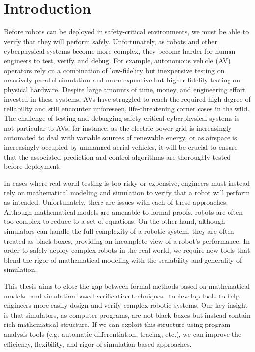 \chapter{Introduction}\label{section:introduction}

Before robots can be deployed in safety-critical environments, we must be able to verify that they will perform safely. Unfortunately, as robots and other cyberphysical systems become more complex, they become harder for human engineers to test, verify, and debug. For example, autonomous vehicle (AV) operators rely on a combination of low-fidelity but inexpensive testing on massively-parallel simulation and more expensive but higher fidelity testing on physical hardware. Despite large amounts of time, money, and engineering effort invested in these systems, AVs have struggled to reach the required high degree of reliability and still encounter unforeseen, life-threatening corner cases in the wild. The challenge of testing and debugging safety-critical cyberphysical systems is not particular to AVs; for instance, as the electric power grid is increasingly automated to deal with variable sources of renewable energy, or as airspace is increasingly occupied by unmanned aerial vehicles, it will be crucial to ensure that the associated prediction and control algorithms are thoroughly tested before deployment.

In cases where real-world testing is too risky or expensive, engineers must instead rely on mathematical modeling and simulation to verify that a robot will perform as intended. Unfortunately, there are issues with each of these approaches. Although mathematical models are amenable to formal proofs, robots are often too complex to reduce to a set of equations. On the other hand, although simulators can handle the full complexity of a robotic system, they are often treated as black-boxes, providing an incomplete view of a robot's performance. In order to safely deploy complex robots in the real world, we require new tools that blend the rigor of mathematical modeling with the scalability and generality of simulation.

This thesis aims to close the gap between formal methods based on mathematical models~\cite{beltaFormalMethodsControl2019,kress-gazitSynthesisRobotsGuarantees2018} and simulation-based verification techniques~\cite{zhouRoCUSRobotController2021,corsoSurveyAlgorithmsBlackBox2021,okellyScalableEndtoEndAutonomous2018} to develop tools to help engineers more easily design and verify complex robotic systems. Our key insight is that simulators, as computer programs, are not black boxes but instead contain rich mathematical structure. If we can exploit this structure using program analysis tools (e.g. automatic differentiation, tracing, etc.), we can improve the efficiency, flexibility, and rigor of simulation-based approaches.

